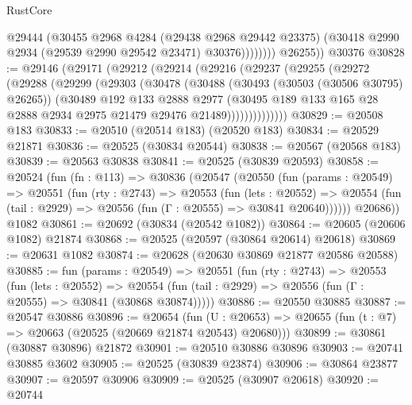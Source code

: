 \begin{lexlean}{RustCore}
\begin{coremodule}
                    @29444
                    (@30455
                      @2968
                      @4284
                      (@29438 @2968 @29442 @23375)
                      (@30418 @2990 @2934 (@29539 @2990 @29542 @23471) @30376))))))))
        @26255))
    @30376
@30828 := @29146
    (@29171
      (@29212
        (@29214
          (@29216
            (@29237
              (@29255
                (@29272
                  (@29288
                    (@29299
                      (@29303
                        (@30478
                          (@30488
                            (@30493 (@30503 (@30506 @30795) @26265))
                            (@30489
                              @192
                              @133
                              @2888
                              @2977
                              (@30495
                                @189
                                @133
                                @165
                                @28
                                @2888
                                @2934
                                @2975
                                @21479
                                @29476
                                @21489))))))))))))))
@30829 := @20508 @183
@30833 := @20510 (@20514 @183) (@20520 @183)
@30834 := @20529 @21871
@30836 := @20525 (@30834 @20544)
@30838 := @20567 (@20568 @183)
@30839 := @20563 @30838
@30841 := @20525 (@30839 @20593)
@30858 := @20524
    (fun (fn : @113) =>
    @30836
      (@20547
        (@20550
          (fun (params : @20549) =>
          @20551
            (fun (rty : @2743) =>
            @20553
              (fun (lets : @20552) =>
              @20554 (fun (tail : @2929) => @20556 (fun (Γ : @20555) => @30841 @20640))))))
        @20686))
    @1082
@30861 := @20692 (@30834 (@20542 @1082))
@30864 := @20605 (@20606 @1082) @21874
@30868 := @20525 (@20597 (@30864 @20614) @20618)
@30869 := @20631 @1082
@30874 := @20628 (@20630 @30869 @21877 @20586 @20588)
@30885 := fun (params : @20549) =>
  @20551
    (fun (rty : @2743) =>
    @20553
      (fun (lets : @20552) =>
      @20554 (fun (tail : @2929) => @20556 (fun (Γ : @20555) => @30841 (@30868 @30874)))))
@30886 := @20550 @30885
@30887 := @20547 @30886
@30896 := @20654
    (fun (U : @20653) => @20655 (fun (t : @7) => @20663 (@20525 (@20669 @21874 @20543) @20680)))
@30899 := @30861 (@30887 @30896) @21872
@30901 := @20510 @30886 @30896
@30903 := @20741 @30885 @3602
@30905 := @20525 (@30839 @23874)
@30906 := @30864 @23877
@30907 := @20597 @30906
@30909 := @20525 (@30907 @20618)
@30920 := @20744

\end{coremodule}
\end{lexlean}
